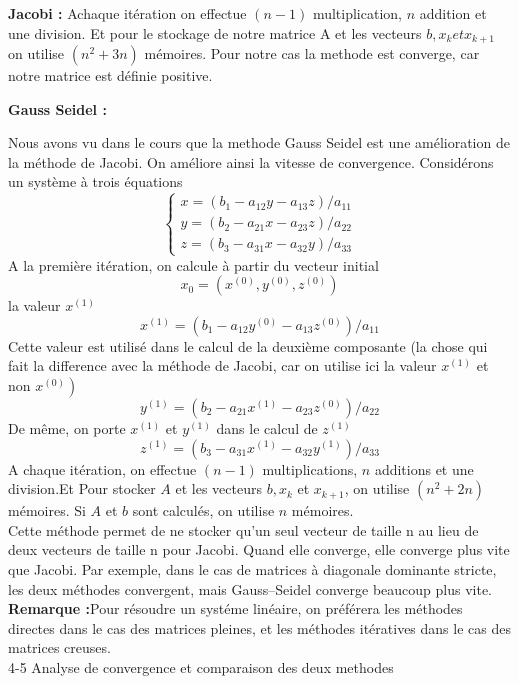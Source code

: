 \documentclass[12pt]{report}
\begin{document}
\textbf{Jacobi :} Achaque itération on effectue $(n-1)$ multiplication, $n$ addition et une division. Et pour le stockage de notre matrice A et les vecteurs $b, x_{k} {et} x_{k+1}$ on utilise $(n^{2} + 3n)$ mémoires.
Pour notre cas la methode est converge, car notre matrice est définie positive.

\textbf{Gauss Seidel :}

Nous avons vu dans le cours que la methode Gauss Seidel est une amélioration de la méthode de Jacobi. On améliore ainsi la vitesse de convergence. Considérons un système à trois équations
$$
\left\{\begin{array}{l}
x=\left(b_{1}-a_{12} y-a_{13} z\right) / a_{11} \\
y=\left(b_{2}-a_{21} x-a_{23} z\right) / a_{22} \\
z=\left(b_{3}-a_{31} x-a_{32} y\right) / a_{33}
\end{array}\right.
$$
A la première itération, on calcule à partir du vecteur initial
$$
x_{0}=\left(x^{(0)}, y^{(0)}, z^{(0)}\right)
$$
la valeur $x^{(1)}$
$$
x^{(1)}=\left(b_{1}-a_{12} y^{(0)}-a_{13} z^{(0)}\right) / a_{11}
$$
Cette valeur est utilisé dans le calcul de la deuxième composante (la chose qui fait la difference avec la méthode de Jacobi, car on utilise ici la valeur $x^{(1)}$ et non $\left.x^{(0)}\right)$
$$
y^{(1)}=\left(b_{2}-a_{21} x^{(1)}-a_{23} z^{(0)}\right) / a_{22}
$$ 
De même, on porte $x^{(1)}$ et $y^{(1)}$ dans le calcul de $z^{(1)}$
$$
z^{(1)}=\left(b_{3}-a_{31} x^{(1)}-a_{32} y^{(1)}\right) / a_{33}
$$
A chaque itération, on effectue $(n-1)$ multiplications, $n$ additions et une division.Et Pour stocker $A$ et les vecteurs $b, x_{k}$ et $x_{k+1}$, on utilise $\left(n^{2}+2 n\right)$ mémoires. Si $A$ et $b$ sont calculés, on utilise $n$ mémoires.\\

Cette méthode permet de ne stocker qu’un seul vecteur de taille n au lieu de deux vecteurs de taille n pour Jacobi. Quand elle converge, elle converge plus vite que Jacobi. Par exemple, dans le cas de matrices à diagonale dominante stricte, les deux méthodes convergent, mais Gauss–Seidel converge beaucoup plus vite.\\


\textbf{Remarque :}Pour résoudre un systéme linéaire, on préférera les méthodes directes dans le cas des matrices pleines, et les méthodes itératives dans le cas des matrices creuses.\\


4-5 Analyse de convergence et comparaison des deux methodes\\
\end{document}
